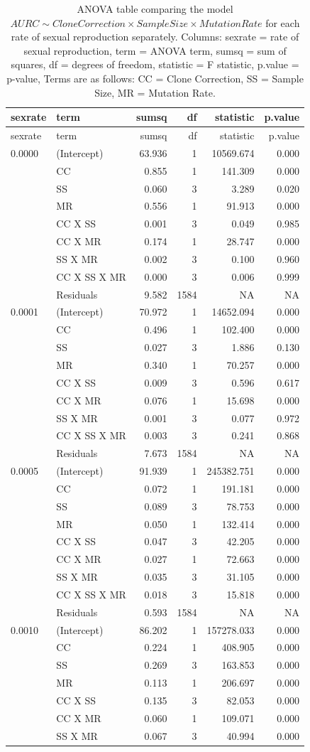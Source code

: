 \documentclass[double,11pt]{beavtex}
\begin{document}
  \begin{longtable}[]{@{}llrrrr@{}}
  \caption{\label{tab:sim3} ANOVA table comparing the model
  \(AURC \sim Clone Correction \times Sample Size \times Mutation Rate\)
  for each rate of sexual reproduction separately. Columns: sexrate = rate
  of sexual reproduction, term = ANOVA term, sumsq = sum of squares, df =
  degrees of freedom, statistic = F statistic, p.value = p-value, Terms
  are as follows: CC = Clone Correction, SS = Sample Size, MR = Mutation
  Rate.}\tabularnewline
  \toprule
  sexrate & term & sumsq & df & statistic & p.value\tabularnewline
  \midrule
  \endfirsthead
  \toprule
  sexrate & term & sumsq & df & statistic & p.value\tabularnewline
  \midrule
  \endhead
  0.0000 & (Intercept) & 63.936 & 1 & 10569.674 & 0.000\tabularnewline
  & CC & 0.855 & 1 & 141.309 & 0.000\tabularnewline
  & SS & 0.060 & 3 & 3.289 & 0.020\tabularnewline
  & MR & 0.556 & 1 & 91.913 & 0.000\tabularnewline
  & CC X SS & 0.001 & 3 & 0.049 & 0.985\tabularnewline
  & CC X MR & 0.174 & 1 & 28.747 & 0.000\tabularnewline
  & SS X MR & 0.002 & 3 & 0.100 & 0.960\tabularnewline
  & CC X SS X MR & 0.000 & 3 & 0.006 & 0.999\tabularnewline
  & Residuals & 9.582 & 1584 & NA & NA\tabularnewline
  0.0001 & (Intercept) & 70.972 & 1 & 14652.094 & 0.000\tabularnewline
  & CC & 0.496 & 1 & 102.400 & 0.000\tabularnewline
  & SS & 0.027 & 3 & 1.886 & 0.130\tabularnewline
  & MR & 0.340 & 1 & 70.257 & 0.000\tabularnewline
  & CC X SS & 0.009 & 3 & 0.596 & 0.617\tabularnewline
  & CC X MR & 0.076 & 1 & 15.698 & 0.000\tabularnewline
  & SS X MR & 0.001 & 3 & 0.077 & 0.972\tabularnewline
  & CC X SS X MR & 0.003 & 3 & 0.241 & 0.868\tabularnewline
  & Residuals & 7.673 & 1584 & NA & NA\tabularnewline
  0.0005 & (Intercept) & 91.939 & 1 & 245382.751 & 0.000\tabularnewline
  & CC & 0.072 & 1 & 191.181 & 0.000\tabularnewline
  & SS & 0.089 & 3 & 78.753 & 0.000\tabularnewline
  & MR & 0.050 & 1 & 132.414 & 0.000\tabularnewline
  & CC X SS & 0.047 & 3 & 42.205 & 0.000\tabularnewline
  & CC X MR & 0.027 & 1 & 72.663 & 0.000\tabularnewline
  & SS X MR & 0.035 & 3 & 31.105 & 0.000\tabularnewline
  & CC X SS X MR & 0.018 & 3 & 15.818 & 0.000\tabularnewline
  & Residuals & 0.593 & 1584 & NA & NA\tabularnewline
  0.0010 & (Intercept) & 86.202 & 1 & 157278.033 & 0.000\tabularnewline
  & CC & 0.224 & 1 & 408.905 & 0.000\tabularnewline
  & SS & 0.269 & 3 & 163.853 & 0.000\tabularnewline
  & MR & 0.113 & 1 & 206.697 & 0.000\tabularnewline
  & CC X SS & 0.135 & 3 & 82.053 & 0.000\tabularnewline
  & CC X MR & 0.060 & 1 & 109.071 & 0.000\tabularnewline
  & SS X MR & 0.067 & 3 & 40.994 & 0.000\tabularnewline

\end{longtable}
\end{document}
